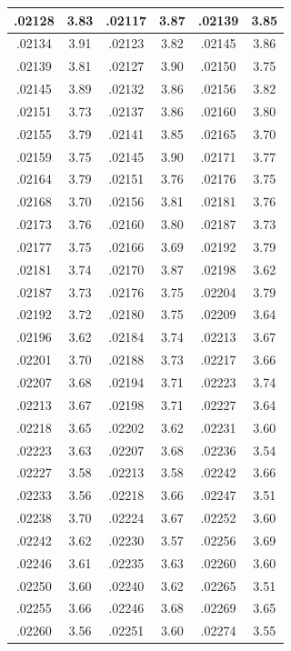 \documentclass[10pt,twoside]{report}
\begin{document}
\begin{appendices}
\begin{longtable}{|c|c||c|c||c|c|}
.02128 & 3.83 & .02117 & 3.87 & .02139 & 3.85\\\hline
.02134 & 3.91 & .02123 & 3.82 & .02145 & 3.86\\\hline
.02139 & 3.81 & .02127 & 3.90 & .02150 & 3.75\\\hline
.02145 & 3.89 & .02132 & 3.86 & .02156 & 3.82\\\hline
.02151 & 3.73 & .02137 & 3.86 & .02160 & 3.80\\\hline
.02155 & 3.79 & .02141 & 3.85 & .02165 & 3.70\\\hline
.02159 & 3.75 & .02145 & 3.90 & .02171 & 3.77\\\hline
.02164 & 3.79 & .02151 & 3.76 & .02176 & 3.75\\\hline
.02168 & 3.70 & .02156 & 3.81 & .02181 & 3.76\\\hline
.02173 & 3.76 & .02160 & 3.80 & .02187 & 3.73\\\hline
.02177 & 3.75 & .02166 & 3.69 & .02192 & 3.79\\\hline
.02181 & 3.74 & .02170 & 3.87 & .02198 & 3.62\\\hline
.02187 & 3.73 & .02176 & 3.75 & .02204 & 3.79\\\hline
.02192 & 3.72 & .02180 & 3.75 & .02209 & 3.64\\\hline
.02196 & 3.62 & .02184 & 3.74 & .02213 & 3.67\\\hline
.02201 & 3.70 & .02188 & 3.73 & .02217 & 3.66\\\hline
.02207 & 3.68 & .02194 & 3.71 & .02223 & 3.74\\\hline
.02213 & 3.67 & .02198 & 3.71 & .02227 & 3.64\\\hline
.02218 & 3.65 & .02202 & 3.62 & .02231 & 3.60\\\hline
.02223 & 3.63 & .02207 & 3.68 & .02236 & 3.54\\\hline
.02227 & 3.58 & .02213 & 3.58 & .02242 & 3.66\\\hline
.02233 & 3.56 & .02218 & 3.66 & .02247 & 3.51\\\hline
.02238 & 3.70 & .02224 & 3.67 & .02252 & 3.60\\\hline
.02242 & 3.62 & .02230 & 3.57 & .02256 & 3.69\\\hline
.02246 & 3.61 & .02235 & 3.63 & .02260 & 3.60\\\hline
.02250 & 3.60 & .02240 & 3.62 & .02265 & 3.51\\\hline
.02255 & 3.66 & .02246 & 3.68 & .02269 & 3.65\\\hline
.02260 & 3.56 & .02251 & 3.60 & .02274 & 3.55\\\hline

\end{longtable}
\end{appendices}
\end{document}
